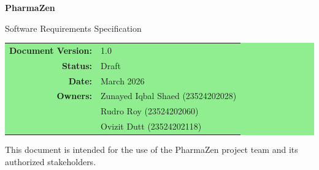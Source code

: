 \documentclass[12pt, a4paper]{article}
\begin{document}

\begin{titlepage}
  \centering
  \vspace*{3cm}

  {\fontsize{42}{50}\selectfont\color{pharmagreen}\textbf{PharmaZen}}

  \vspace{0.6cm}
  {\Large\color{textgray} Software Requirements Specification}

  \vspace{2cm}

  \vspace{1.5cm}
  \colorbox{lightgreen}{%
    \parbox{12cm}{%
      \vspace{10pt}
      \centering
      \renewcommand{\arraystretch}{1.6}
      \begin{tabular}{rl}
        \textbf{Document Version:} & 1.0 \\
        \textbf{Status:}           & Draft \\
        \textbf{Date:}             & March 2026 \\
        \textbf{Owners:}           & Zunayed Iqbal Shaed (23524202028) \\
                                   & Rudro Roy (23524202060) \\
                                   & Ovizit Dutt (23524202118) \\
      \end{tabular}
      \vspace{10pt}
    }%
  }

  \vfill
  \vspace{0.4cm}
  {\small\color{textgray} This document is intended for the use of the PharmaZen project team and its authorized stakeholders.}
\end{titlepage}

\tableofcontents
\newpage
{}
\end{document}
